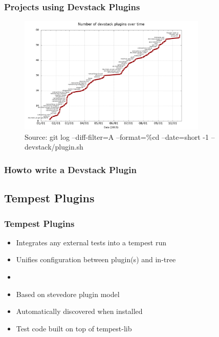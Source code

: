 \documentclass[aspectratio=169,11pt,hyperref={colorlinks=true}]{beamer}
\begin{document}
\begin{frame}
    \frametitle{Projects using Devstack Plugins}
    \begin{figure}[p]
    	\centering
    	\includegraphics[width=0.8\textwidth]{devstack-plugins.png}
    	\caption{Source: git log --diff-filter=A --format=\%cd --date=short -1 -- devstack/plugin.sh}
    \end{figure}
\end{frame}

\begin{frame}
    \frametitle{Howto write a Devstack Plugin}
\end{frame}

\subsection{Tempest Plugins}
\begin{frame}
    \frametitle{Tempest Plugins}
    \begin{itemize}
        \item Integrates any external tests into a tempest run
        \item Unifies configuration between plugin(s) and in-tree
        \item 
    \end{itemize}
    \begin{itemize}
    	\item{Based on stevedore plugin model}
    	\item{Automatically discovered when installed}
    	\item{Test code built on top of tempest-lib}
    \end{itemize}
\end{frame}
\end{document}
